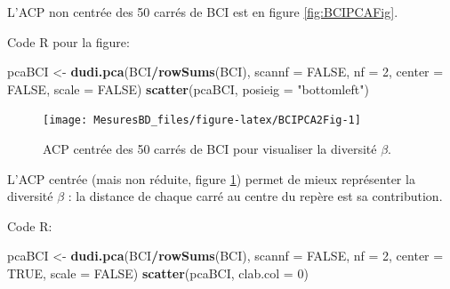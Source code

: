 \documentclass[
  11pt,
  french,
  a4paper,
  extrafontsizes,onecolumn,openright
  ]{memoir}
\newenvironment{Shaded}{\begin{snugshade}}{\end{snugshade}}
\newcommand{\AttributeTok}[1]{\textcolor[rgb]{0.13,0.29,0.53}{#1}}
\newcommand{\ConstantTok}[1]{\textcolor[rgb]{0.56,0.35,0.01}{#1}}
\newcommand{\DecValTok}[1]{\textcolor[rgb]{0.00,0.00,0.81}{#1}}
\newcommand{\FunctionTok}[1]{\textcolor[rgb]{0.13,0.29,0.53}{\textbf{#1}}}
\newcommand{\NormalTok}[1]{#1}
\newcommand{\OtherTok}[1]{\textcolor[rgb]{0.56,0.35,0.01}{#1}}
\newcommand{\SpecialCharTok}[1]{\textcolor[rgb]{0.81,0.36,0.00}{\textbf{#1}}}
\newcommand{\StringTok}[1]{\textcolor[rgb]{0.31,0.60,0.02}{#1}}
\begin{document}
\normalsize

L'ACP non centrée des 50 carrés de BCI est en figure \ref{fig:BCIPCAFig}.

Code R pour la figure:

\scriptsize

\begin{Shaded}
\begin{Highlighting}[]
\NormalTok{pcaBCI }\OtherTok{\textless{}{-}} \FunctionTok{dudi.pca}\NormalTok{(BCI}\SpecialCharTok{/}\FunctionTok{rowSums}\NormalTok{(BCI), }\AttributeTok{scannf =} \ConstantTok{FALSE}\NormalTok{, }\AttributeTok{nf =} \DecValTok{2}\NormalTok{,}
    \AttributeTok{center =} \ConstantTok{FALSE}\NormalTok{, }\AttributeTok{scale =} \ConstantTok{FALSE}\NormalTok{)}
\FunctionTok{scatter}\NormalTok{(pcaBCI, }\AttributeTok{posieig =} \StringTok{"bottomleft"}\NormalTok{)}
\end{Highlighting}
\end{Shaded}

\normalsize



\scriptsize

\begin{figure}

{\centering \texttt{[image: MesuresBD\_files/figure-latex/BCIPCA2Fig-1]} 

}

\caption{ACP centrée des 50 carrés de BCI pour visualiser la diversité \(\beta\).}\label{fig:BCIPCA2Fig}
\end{figure}

\normalsize

L'ACP centrée (mais non réduite, figure \ref{fig:BCIPCA2Fig}) permet de mieux représenter la diversité \(\beta\) : la distance de chaque carré au centre du repère est sa contribution.

Code R:

\scriptsize

\begin{Shaded}
\begin{Highlighting}[]
\NormalTok{pcaBCI }\OtherTok{\textless{}{-}} \FunctionTok{dudi.pca}\NormalTok{(BCI}\SpecialCharTok{/}\FunctionTok{rowSums}\NormalTok{(BCI), }\AttributeTok{scannf =} \ConstantTok{FALSE}\NormalTok{, }\AttributeTok{nf =} \DecValTok{2}\NormalTok{,}
    \AttributeTok{center =} \ConstantTok{TRUE}\NormalTok{, }\AttributeTok{scale =} \ConstantTok{FALSE}\NormalTok{)}
\FunctionTok{scatter}\NormalTok{(pcaBCI, }\AttributeTok{clab.col =} \DecValTok{0}\NormalTok{)}
\end{Highlighting}
\end{Shaded}
\end{document}
